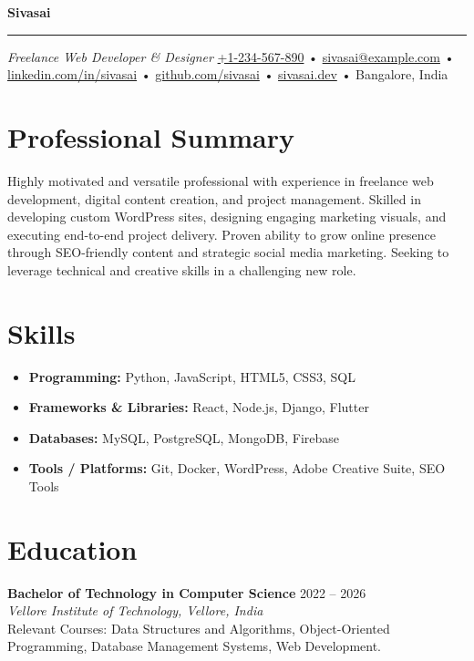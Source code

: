 \documentclass[a4paper,11pt]{article}
\makeatletter
\newcommand{\resumeline}{\noindent\rule{\linewidth}{0.4pt}}
\newcommand{\fullname}{Sivasai}
\newcommand{\jobtitle}{Freelance Web Developer & Designer}
\newcommand{\phone}{+1-234-567-890}
\newcommand{\email}{sivasai@example.com}
\newcommand{\linkedin}{linkedin.com/in/sivasai}
\newcommand{\github}{github.com/sivasai}
\newcommand{\website}{sivasai.dev}
\newcommand{\address}{Bangalore, India}
\makeatother
\begin{document}
\begin{center}
    {\Huge \textbf{\fullname}}
    \vspace{0.1cm}
    \resumeline
    \vspace{0.1cm}
    {\large \textit{\jobtitle}}
    \vspace{0.1cm}
    \href{tel:\phone}{\phone} • \href{mailto:\email}{\email} • \href{https://\linkedin}{\linkedin} • \href{https://\github}{\github} • \href{https://\website}{\website} • \address
\end{center}

\section*{Professional Summary}
Highly motivated and versatile professional with experience in freelance web development, digital content creation, and project management. Skilled in developing custom WordPress sites, designing engaging marketing visuals, and executing end-to-end project delivery. Proven ability to grow online presence through SEO-friendly content and strategic social media marketing. Seeking to leverage technical and creative skills in a challenging new role.

\section*{Skills}
\begin{itemize}[leftmargin=*, label={}]
    \item \textbf{Programming:} Python, JavaScript, HTML5, CSS3, SQL
    \item \textbf{Frameworks & Libraries:} React, Node.js, Django, Flutter
    \item \textbf{Databases:} MySQL, PostgreSQL, MongoDB, Firebase
    \item \textbf{Tools / Platforms:} Git, Docker, WordPress, Adobe Creative Suite, SEO Tools
\end{itemize}

\section*{Education}
\textbf{Bachelor of Technology in Computer Science} \hfill 2022 -- 2026 \\
\textit{Vellore Institute of Technology, Vellore, India} \\
Relevant Courses: Data Structures and Algorithms, Object-Oriented Programming, Database Management Systems, Web Development.
\end{document}
